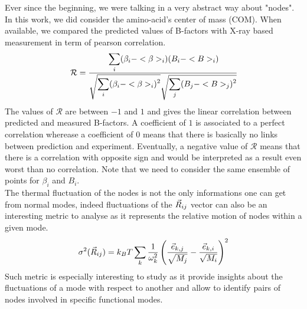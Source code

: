 \noindent Ever since the beginning, we were talking in a very abstract way about "nodes". In this work, we did consider the amino-acid's center of mass (COM). When available, we compared the predicted values of B-factors with X-ray based measurement in term of pearson correlation.
\begin{equation}
	\label{pearsonr}
	\mathcal{R} = \cfrac{\displaystyle\sum_i (\beta_i - <\beta>_i)(B_i - <B>_i)}{\sqrt{\displaystyle\sum_i(\beta_i - <\beta>_i)^2}\sqrt{\displaystyle\sum_j(B_j - <B>_j)^2}}
\end{equation}
The values of $\mathcal{R}$ are between $-1$ and $1$ and gives the linear correlation between predicted and measured B-factors. A coefficient of $1$ is associated to a perfect correlation wherease a coefficient of $0$ means that there is basically no links between prediction and experiment. Eventually, a negative value of $\mathcal{R}$ means that there is a correlation with opposite sign and would be interpreted as a result even worst than no correlation. Note that we need to consider the same ensemble of points for $\beta_i$ and $B_i$.\\
\noindent The thermal fluctuation of the nodes is not the only informations one can get from normal modes, indeed fluctuations of the $\vec{R}_{ij}$ vector can also be an interesting metric to analyse as it represents the relative motion of nodes within a given mode. 
\begin{equation}
	\label{metric dij}
	\sigma^2 (\vec{R}_{ij}) = k_BT\sum_k \frac{1}{\omega_k^2}\left( \frac{\vec{e}_{k, j}}{\sqrt{M_j}} - \frac{\vec{e}_{k, i}}{\sqrt{M_i}} \right)^2
\end{equation}
Such metric is especially interesting to study as it provide insights about the fluctuations of a mode with respect to another and allow to identify pairs of nodes involved in specific functional modes.
